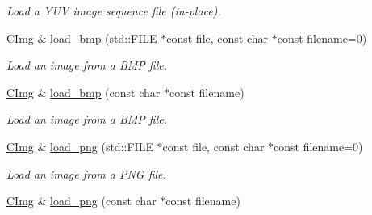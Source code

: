 \begin{DoxyCompactItemize}
\begin{DoxyCompactList}\small\item\em Load a YUV image sequence file (in-\/place). \item\end{DoxyCompactList}\item 
\hypertarget{structcimg__library_1_1_c_img_a9d9eab2fca0c2ac1c0dd22ef114a5f8e}{
\hyperlink{structcimg__library_1_1_c_img}{CImg} \& \hyperlink{structcimg__library_1_1_c_img_a9d9eab2fca0c2ac1c0dd22ef114a5f8e}{load\_\-bmp} (std::FILE $\ast$const file, const char $\ast$const filename=0)}
\label{structcimg__library_1_1_c_img_a9d9eab2fca0c2ac1c0dd22ef114a5f8e}

\begin{DoxyCompactList}\small\item\em Load an image from a BMP file. \item\end{DoxyCompactList}\item 
\hypertarget{structcimg__library_1_1_c_img_a1ddb0c4a55723922e866f971e5c87dd9}{
\hyperlink{structcimg__library_1_1_c_img}{CImg} \& \hyperlink{structcimg__library_1_1_c_img_a1ddb0c4a55723922e866f971e5c87dd9}{load\_\-bmp} (const char $\ast$const filename)}
\label{structcimg__library_1_1_c_img_a1ddb0c4a55723922e866f971e5c87dd9}

\begin{DoxyCompactList}\small\item\em Load an image from a BMP file. \item\end{DoxyCompactList}\item 
\hypertarget{structcimg__library_1_1_c_img_a88eae066c138394b1659b051ce5e0aaa}{
\hyperlink{structcimg__library_1_1_c_img}{CImg} \& \hyperlink{structcimg__library_1_1_c_img_a88eae066c138394b1659b051ce5e0aaa}{load\_\-png} (std::FILE $\ast$const file, const char $\ast$const filename=0)}
\label{structcimg__library_1_1_c_img_a88eae066c138394b1659b051ce5e0aaa}

\begin{DoxyCompactList}\small\item\em Load an image from a PNG file. \item\end{DoxyCompactList}\item 
\hypertarget{structcimg__library_1_1_c_img_aeb0ba1f9a9049f4444ac63e118fb2c0f}{
\hyperlink{structcimg__library_1_1_c_img}{CImg} \& \hyperlink{structcimg__library_1_1_c_img_aeb0ba1f9a9049f4444ac63e118fb2c0f}{load\_\-png} (const char $\ast$const filename)}
\label{structcimg__library_1_1_c_img_aeb0ba1f9a9049f4444ac63e118fb2c0f}


\end{DoxyCompactItemize}
